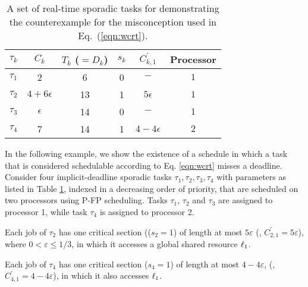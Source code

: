 

%

\begin{table}[t]
\centering
    \begin{tabular}{|c|c|c|c|c|c|} 
 \hline
        $\tau_k$ & $C_k$ & $T_k$ ($= D_k$) & $s_k$ & $C_{k,1}^{\prime}$ & Processor\\
        \hline
        $\tau_1$ & 2             & 6  & 0 & $-$ & $1$\\ 
        $\tau_2$ & $4+6\epsilon$ & 13 & 1 & $5\epsilon$& $1$\\
        $\tau_3$ & $\epsilon$    & 14 & 0 & $-$ & $1$\\
        $\tau_4$ & 7             & 14 & 1 & $4-4\epsilon$ & $2$\\ 
        \hline
    \end{tabular}
    \caption{A set of real-time sporadic tasks for demonstrating the counterexample for the misconception used in Eq.~(\ref{eqn:wcrt}).}
    \label{table:parameters}
\end{table}

In the following example, 
we show the existence of a schedule in which a task that is considered schedulable according to Eq. \eqref{eqn:wcrt} misses a deadline.
 Consider four implicit-deadline sporadic tasks ${\tau_1, \tau_2, \tau_3, \tau_4}$ with parameters as listed in Table \ref{table:parameters}, indexed in a decreasing order of priority, that are scheduled on two processors using P-FP scheduling. Tasks $\tau_1$, $\tau_2$ and $\tau_3$ are assigned to processor 1, while task $\tau_4$ is assigned to processor 2.

Each job of $\tau_2$ has one critical section (($s_2 = 1$) of length at most $5\varepsilon$ (\ie, $C_{2,1}^{\prime} = 5\varepsilon$), where $0 < \varepsilon \leq 1/3$, in which it accesses a global shared resource $\ell_1$.

Each job of $\tau_4$ has one critical section ($s_4 = 1$) of length at most $4-4\varepsilon$, (\ie, $C_{4,1}^{\prime} = 4-4\varepsilon$), in which it also accesses $\ell_1$.


